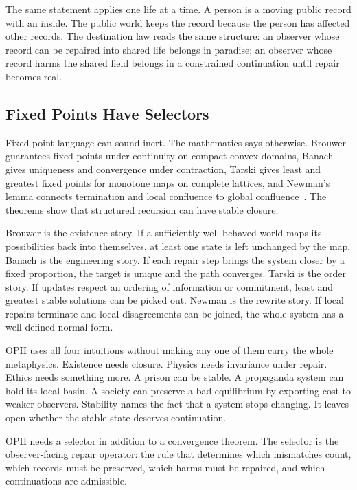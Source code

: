 \documentclass[11pt]{article}
\theoremstyle{remark}
\theoremstyle{plain}
\begin{document}
The same statement applies one life at a time. A person is a moving public
record with an inside. The public world keeps the record because the person has
affected other records. The destination law reads the same structure: an
observer whose record can be repaired into shared life belongs in paradise; an
observer whose record harms the shared field belongs in a constrained
continuation until repair becomes real.

\subsection{Fixed Points Have Selectors}

Fixed-point language can sound inert. The mathematics says otherwise. Brouwer guarantees fixed
points under continuity on compact convex domains, Banach gives uniqueness and
convergence under contraction, Tarski gives least and greatest fixed points for
monotone maps on complete lattices, and Newman's lemma connects termination and
local confluence to global confluence~\cite{Brouwer1912,Banach1922,Tarski1955,Newman1942}.
The theorems show that structured recursion can have stable closure.

Brouwer is the existence story. If a sufficiently well-behaved world maps its
possibilities back into themselves, at least one state is left unchanged by the
map. Banach is the engineering story. If each repair step brings the system
closer by a fixed proportion, the target is unique and the path converges.
Tarski is the order story. If updates respect an ordering of information or
commitment, least and greatest stable solutions can be picked out. Newman is the
rewrite story. If local repairs terminate and local disagreements can be joined,
the whole system has a well-defined normal form.

OPH uses all four intuitions without making any one of them carry the whole
metaphysics. Existence needs closure. Physics needs invariance under repair.
Ethics needs something more. A prison can be stable. A propaganda system can
hold its local basin. A society can preserve a bad equilibrium by exporting cost
to weaker observers. Stability names the fact that a system stops changing. It
leaves open whether the stable state deserves continuation.

OPH needs a selector in addition to a convergence theorem. The
selector is the observer-facing repair operator: the rule that determines which
mismatches count, which records must be preserved, which harms must be repaired,
and which continuations are admissible.
\end{document}
